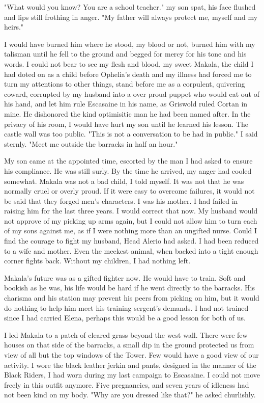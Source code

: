 \documentclass{article}
\begin{document}
"What would you know? You are a school teacher." my son spat, his face flushed and lips still frothing in anger. "My father will always protect me, myself and my heirs." 

I would have burned him where he stood, my blood or not, burned him with my talisman until he fell to the ground and begged for mercy for his tone and his words. I could not bear to see my flesh and blood, my sweet Makala, the child I had doted on as a child before Ophelia's death and my illness had forced me to turn my attentions to other things, stand before me as a corpulent, quivering coward, corrupted by my husband into a over proud puppet who would eat out of his hand, and let him rule Escasaine in his name, as Griswold ruled Cortan in mine. He dishonored the kind optimisitic man he had been named after. In the privacy of his room, I would have hurt my son until he learned his lesson. The castle wall was too public. "This is not a conversation to be had in public." I said sternly. "Meet me outside the barracks in half an hour." 

My son came at the appointed time, escorted by the man I had asked to ensure his compliance. He was still surly. By the time he arrived, my anger had cooled somewhat. Makala was not a bad child, I told myself. It was not that he was normally cruel or overly proud. If it were easy to overcome failures, it would not be said that they forged men's characters. I was his mother. I had failed in raising him for the last three years. I would correct that now. My husband would not approve of my picking up arms again, but I could not allow him to turn each of my sons against me, as if I were nothing more than an ungifted nurse. Could I find the courage to fight my husband, Head Alerio had asked. I had been reduced to a wife and mother. Even the meekest animal, when backed into a tight enough corner fights back. Without my children, I had nothing left.

Makala's future was as a gifted fighter now. He would have to train. Soft and bookish as he was, his life would be hard if he went directly to the barracks. His charisma and his station may prevent his peers from picking on him, but it would do nothing to help him meet his training sergent's demands. I had not trained since I had carried Elena, perhaps this would be a good lesson for both of us.

I led Makala to a patch of cleared grass beyond the west wall. There were few houses on that side of the barracks, a small dip in the ground protected us from view of all but the top windows of the Tower. Few would have a good view of our activity. I wore the black leather jerkin and pants, designed in the manner of the Black Riders, I had worn during my last campaign to Escasaine. I could not move freely in this outfit anymore. Five pregnancies, and seven years of idleness had not been kind on my body. "Why are you dressed like that?" he asked churlishly.
\end{document}
